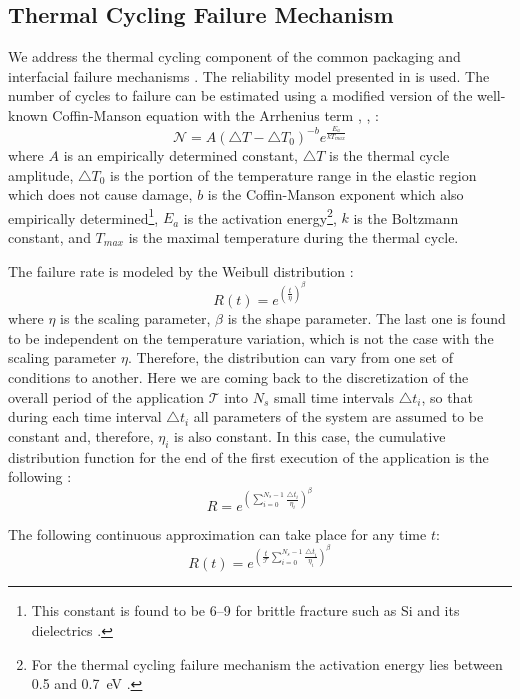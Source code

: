 \subsection{Thermal Cycling Failure Mechanism}
We address the thermal cycling component of the common packaging and interfacial failure mechanisms \cite{jedec2010}. The reliability model presented in \cite{xiang2010} is used. The number of cycles to failure can be estimated using a modified version of the well-known Coffin-Manson equation with the Arrhenius term \cite{jedec2010}, \cite{xiang2010}, \cite{ciappa2003}:
\begin{equation} \label{eq:cycles-to-failure}
  \mathcal{N} = A (\triangle T - \triangle T_0)^{-b} e^{\frac{E_a}{k T_{max}}}
\end{equation}
where $A$ is an empirically determined constant, $\triangle T$ is the thermal cycle amplitude, $\triangle T_0$ is the portion of the temperature range in the elastic region which does not cause damage, $b$ is the Coffin-Manson exponent which also empirically determined\footnote{This constant is found to be 6--9 for brittle fracture such as Si and its dielectrics \cite{jedec2010}.}, $E_{a}$ is the activation energy\footnote{For the thermal cycling failure mechanism the activation energy lies between 0.5 and 0.7~eV \cite{vigrass}.}, $k$ is the Boltzmann constant, and $T_{max}$ is the maximal temperature during the thermal cycle.

The failure rate is modeled by the Weibull distribution \cite{xiang2010}:
\[
  R(t) = e^{(\frac{t}{\eta})^\beta}
\]
where $\eta$ is the scaling parameter, $\beta$ is the shape parameter. The last one is found to be independent on the temperature variation, which is not the case with the scaling parameter $\eta$. Therefore, the distribution can vary from one set of conditions to another. Here we are coming back to the discretization of the overall period of the application $\mathcal{T}$ into $N_s$ small time intervals $\triangle t_i$, so that during each time interval $\triangle t_i$ all parameters of the system are assumed to be constant and, therefore, $\eta_i$ is also constant. In this case, the cumulative distribution function for the end of the first execution of the application is the following \cite{xiang2010}:
\[
  R = e^{(\sum_{i=0}^{N_s - 1} \frac{\triangle t_i}{\eta_i})^\beta}
\]

The following continuous approximation can take place for any time $t$:
\[
  R(t) = e^{(\frac{t}{\mathcal{T}} \sum_{i=0}^{N_s - 1} \frac{\triangle t_i}{\eta_i})^\beta}
\]

